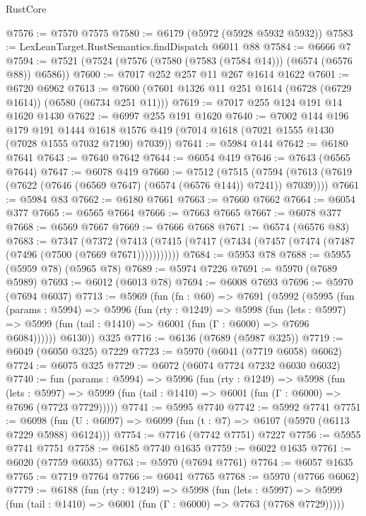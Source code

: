 \begin{lexlean}{RustCore}
\begin{coremodule}
@7576 := @7570 @7575
@7580 := @6179 (@5972 (@5928 @5932 @5932))
@7583 := LexLeanTarget.RustSemantics.findDispatch @6011 @88
@7584 := @6666 @7
@7594 := @7521 (@7524 (@7576 (@7580 (@7583 (@7584 @14))) (@6574 (@6576 @88)) @6586))
@7600 := @7017 @252 @257 @11 @267 @1614 @1622
@7601 := @6720 @6962
@7613 := @7600 (@7601 @1326 @11 @251 @1614 (@6728 (@6729 @1614)) (@6580 (@6734 @251 @11)))
@7619 := @7017 @255 @124 @191 @14 @1620 @1430
@7622 := @6997 @255 @191 @1620
@7640 := @7002
    @144
    @196
    @179
    @191
    @1444
    @1618
    @1576
    @419
    (@7014 @1618 (@7021 @1555 @1430 (@7028 @1555 @7032 @7190) @7039))
@7641 := @5984 @144
@7642 := @6180 @7641
@7643 := @7640 @7642
@7644 := @6054 @419
@7646 := @7643 (@6565 @7644)
@7647 := @6078 @419
@7660 := @7512
    (@7515 (@7594 (@7613 (@7619 (@7622 (@7646 (@6569 @7647) (@6574 (@6576 @144)) @7241)) @7039))))
@7661 := @5984 @83
@7662 := @6180 @7661
@7663 := @7660 @7662
@7664 := @6054 @377
@7665 := @6565 @7664
@7666 := @7663 @7665
@7667 := @6078 @377
@7668 := @6569 @7667
@7669 := @7666 @7668
@7671 := @6574 (@6576 @83)
@7683 := @7347
    (@7372 (@7413 (@7415 (@7417 (@7434 (@7457 (@7474 (@7487 (@7496 (@7500 (@7669 @7671)))))))))))
@7684 := @5953 @78
@7688 := @5955 (@5959 @78) (@5965 @78)
@7689 := @5974 @7226
@7691 := @5970 (@7689 @5989)
@7693 := @6012 (@6013 @78)
@7694 := @6008 @7693
@7696 := @5970 (@7694 @6037)
@7713 := @5969
    (fun (fn : @60) =>
    @7691
      (@5992
        (@5995
          (fun (params : @5994) =>
          @5996
            (fun (rty : @1249) =>
            @5998
              (fun (lets : @5997) =>
              @5999 (fun (tail : @1410) => @6001 (fun (Γ : @6000) => @7696 @6084))))))
        @6130))
    @325
@7716 := @6136 (@7689 (@5987 @325))
@7719 := @6049 (@6050 @325) @7229
@7723 := @5970 (@6041 (@7719 @6058) @6062)
@7724 := @6075 @325
@7729 := @6072 (@6074 @7724 @7232 @6030 @6032)
@7740 := fun (params : @5994) =>
  @5996
    (fun (rty : @1249) =>
    @5998
      (fun (lets : @5997) =>
      @5999 (fun (tail : @1410) => @6001 (fun (Γ : @6000) => @7696 (@7723 @7729)))))
@7741 := @5995 @7740
@7742 := @5992 @7741
@7751 := @6098 (fun (U : @6097) => @6099 (fun (t : @7) => @6107 (@5970 (@6113 @7229 @5988) @6124)))
@7754 := @7716 (@7742 @7751) @7227
@7756 := @5955 @7741 @7751
@7758 := @6185 @7740 @1635
@7759 := @6022 @1635
@7761 := @6020 (@7759 @6035)
@7763 := @5970 (@7694 @7761)
@7764 := @6057 @1635
@7765 := @7719 @7764
@7766 := @6041 @7765
@7768 := @5970 (@7766 @6062)
@7779 := @6188
    (fun (rty : @1249) =>
    @5998
      (fun (lets : @5997) =>
      @5999 (fun (tail : @1410) => @6001 (fun (Γ : @6000) => @7763 (@7768 @7729)))))

\end{coremodule}
\end{lexlean}
